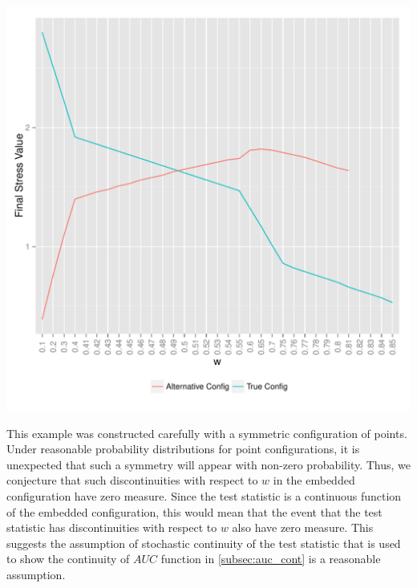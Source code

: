 \documentclass[12pt,oneside,final]{thesis}\usepackage[]{graphicx}\usepackage[]{color}
\makeatletter
\def\maxwidth{ %
  \ifdim\Gin@nat@width>\linewidth
    \linewidth
  \else
    \Gin@nat@width
  \fi
}
\newenvironment{knitrout}{}{} %
\makeatother
\begin{document}

\begin{knitrout}
\color{fgcolor}
\includegraphics[width=\maxwidth]{figure/final_stress_plot} 

\end{knitrout}



This example was constructed carefully with a symmetric configuration of points. Under reasonable probability distributions for point configurations, it is unexpected that such a symmetry will appear with non-zero probability. Thus, we conjecture that such discontinuities with respect to $w$ in the embedded configuration  have zero measure. Since the test statistic is a continuous function of the embedded configuration, this would mean that the event that the test statistic has discontinuities with respect to $w$ also have zero measure. This suggests the assumption of stochastic continuity of the test statistic  that is used to show the continuity of $AUC$ function in \autoref{subsec:auc_cont} is a reasonable assumption.
\end{document}
